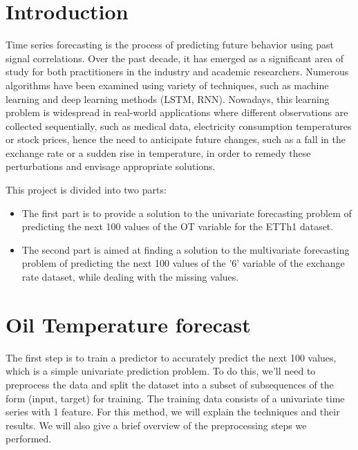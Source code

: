 \documentclass[10pt]{article}
\begin{document}
\begin{multicols}{2}

\section{Introduction}
Time series forecasting is the process of predicting future behavior using past signal correlations.
Over the past decade, it has emerged as a significant area of study for both practitioners in the industry and academic researchers.\newline
Numerous algorithms have been examined using variety of techniques, such as machine learning and deep learning methods (LSTM, RNN).  \cite{c1} \cite{c2}
\newline
Nowadays, this learning problem is widespread in real-world applications where different observations are collected sequentially, such as medical data, electricity consumption temperatures or stock prices, hence the need to anticipate future changes, such as a fall in the exchange rate or a sudden rise in temperature, in order to remedy these perturbations and envisage appropriate solutions.

\vspace{2pt}
This project is divided into two parts:


\begin{itemize}

    \item The first part is to provide a solution to the univariate forecasting problem of predicting the next 100 values of the OT variable for the ETTh1 dataset.

    \item The second part is aimed at finding a solution to the multivariate forecasting problem of predicting the next 100 values of the '6' variable of the exchange rate dataset, while dealing with the missing values.

\end{itemize}


\section{Oil Temperature forecast}
The first step is to train a predictor to accurately predict the next 100 values, which is a simple univariate prediction problem.
To do this, we'll need to preprocess the data and split the dataset into a subset of subsequences of the form (input, target) for training.
The training data consists of a univariate time series with 1 feature.
For this method, we will explain the techniques and their results.
\newline We will also give a brief overview of the preprocessing steps we performed.



\end{multicols}
\end{document}
